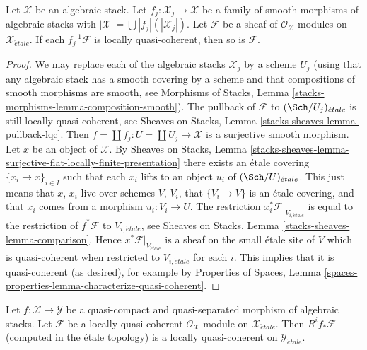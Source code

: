 \begin{lemma}
\label{lemma-check-lqc-on-etale-covering}
Let $\mathcal{X}$ be an algebraic stack. Let
$f_j : \mathcal{X}_j \to \mathcal{X}$ be a family of smooth
morphisms of algebraic stacks with
$|\mathcal{X}| =\bigcup |f_j|(|\mathcal{X}_j|)$.
Let $\mathcal{F}$ be a sheaf of $\mathcal{O}_\mathcal{X}$-modules
on $\mathcal{X}_{\acute{e}tale}$. If each $f_j^{-1}\mathcal{F}$
is locally quasi-coherent, then so is $\mathcal{F}$.
\end{lemma}

\begin{proof}
We may replace each of the algebraic stacks $\mathcal{X}_j$ by
a scheme $U_j$ (using that any algebraic stack has a smooth covering by
a scheme and that compositions of smooth morphisms are smooth, see
Morphisms of Stacks, Lemma \ref{stacks-morphisms-lemma-composition-smooth}).
The pullback of $\mathcal{F}$ to $(\Sch/U_j)_{\acute{e}tale}$ is still
locally quasi-coherent, see
Sheaves on Stacks, Lemma \ref{stacks-sheaves-lemma-pullback-lqc}.
Then $f = \coprod f_j : U = \coprod U_j \to \mathcal{X}$ is a surjective
smooth morphism. Let $x$ be an object of $\mathcal{X}$. By
Sheaves on Stacks, Lemma
\ref{stacks-sheaves-lemma-surjective-flat-locally-finite-presentation}
there exists an \'etale covering $\{x_i \to x\}_{i \in I}$
such that each $x_i$ lifts to an object $u_i$ of $(\Sch/U)_{\acute{e}tale}$.
This just means that $x$, $x_i$ live over schemes $V$, $V_i$, that
$\{V_i \to V\}$ is an \'etale covering, and that $x_i$ comes from
a morphism $u_i : V_i \to U$. The restriction
$x_i^*\mathcal{F}|_{V_{i, \acute{e}tale}}$ is equal to the restriction
of $f^*\mathcal{F}$ to $V_{i, \acute{e}tale}$, see
Sheaves on Stacks, Lemma \ref{stacks-sheaves-lemma-comparison}.
Hence $x^*\mathcal{F}|_{V_{\acute{e}tale}}$
is a sheaf on the small \'etale site of $V$ which is quasi-coherent
when restricted to $V_{i, \acute{e}tale}$ for each $i$.
This implies that it is quasi-coherent (as desired), for example by
Properties of Spaces, Lemma
\ref{spaces-properties-lemma-characterize-quasi-coherent}.
\end{proof}

\begin{lemma}
\label{lemma-pushforward-locally-quasi-coherent}
Let $f : \mathcal{X} \to \mathcal{Y}$ be a quasi-compact and
quasi-separated morphism of algebraic stacks. Let 
$\mathcal{F}$ be a locally quasi-coherent
$\mathcal{O}_\mathcal{X}$-module on $\mathcal{X}_{\acute{e}tale}$.
Then $R^if_*\mathcal{F}$ (computed in the \'etale topology) is
a locally quasi-coherent on $\mathcal{Y}_{\acute{e}tale}$.
\end{lemma}

